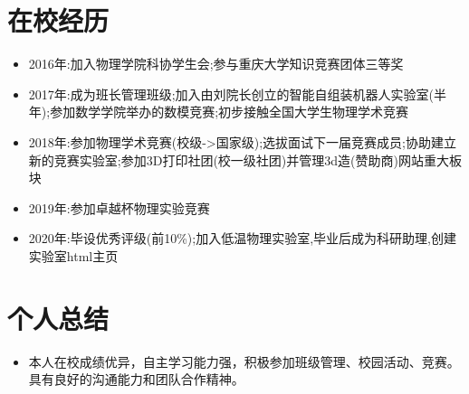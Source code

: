 \documentclass{resume}
\begin{document}
\section{在校经历}

\begin{itemize}
  \item 2016年:加入物理学院科协学生会;参与重庆大学知识竞赛团体三等奖
  \item 2017年:成为班长管理班级;加入由刘院长创立的智能自组装机器人实验室(半年);参加数学学院举办的数模竞赛;初步接触全国大学生物理学术竞赛
  \item 2018年:参加物理学术竞赛(校级->国家级);选拔面试下一届竞赛成员;协助建立新的竞赛实验室;参加3D打印社团(校一级社团)并管理3d造(赞助商)网站重大板块
  \item 2019年:参加卓越杯物理实验竞赛
  \item 2020年:毕设优秀评级(前10\%);加入低温物理实验室,毕业后成为科研助理,创建实验室html主页
\end{itemize}


\section{个人总结}

\begin{itemize}
  \item 本人在校成绩优异，自主学习能力强，积极参加班级管理、校园活动、竞赛。具有良好的沟通能力和团队合作精神。
\end{itemize}
\end{document}
